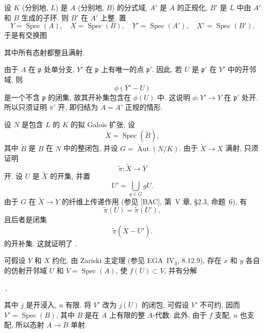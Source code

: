 \textup{}
设 \(K\) (分别地, \(L\)) 是 \(A\) (分别地, \(B\)) 的分式域,
\(A'\) 是 \(A\) 的正规化, \(B'\) 是 \(L\) 中由 \(A'\) 和 \(B\)
生成的子环. 则 \(B'\) 在 \(A'\) 上整. 置
\[
  Y=\operatorname{Spec}(A),\quad
  X=\operatorname{Spec}(B),\quad
  Y'=\operatorname{Spec}(A'),\quad
  X'=\operatorname{Spec}(B').
\]
于是有交换图
\begin{center}
  \label{diag:sga3-VIB-5.6.0-integral-square}%
\end{center}
其中所有态射都整且满射.

由于 \(A\) 在 \(\mathfrak p\) 处单分支,
\(Y'\) 在 \(\mathfrak p\) 上有唯一的点 \(\mathfrak p'\).
因此, 若 \(U\) 是 \(\mathfrak p'\) 在 \(Y'\) 中的开邻域, 则
\[
  \phi(Y'-U)
\]
是一个不含 \(\mathfrak p\) 的闭集,
故其开补集包含在 \(\phi(U)\) 中.
这说明 \(\phi:Y'\to Y\) 在 \(\mathfrak p'\) 处开.
所以只须证明 \(\pi'\) 开, 即归结为 \(A=A'\) 正规的情形.

设 \(N\) 是包含 \(L\) 的 \(K\) 的拟 Galois 扩张, 设
\[
  \widetilde X=\operatorname{Spec}(\widetilde B),
\]
其中 \(\widetilde B\) 是 \(B\) 在 \(N\) 中的整闭包,
并设 \(G=\operatorname{Aut}(N/K)\).
由于 \(\widetilde X\to X\) 满射, 只须证明
\[
  \widetilde\pi:\widetilde X\longrightarrow Y
\]
开. 设 \(U\) 是 \(\widetilde X\) 的开集, 并置
\[
  U'=\bigcup_{g\in G}gU.
\]
由于 \(G\) 在 \(\widetilde X\to Y\) 的纤维上传递作用
(参见 [BAC], 第~V 章, \S2.3, 命题~6), 有
\[
  \widetilde\pi(U)=\widetilde\pi(U'),
\]
且后者是闭集
\[
  \widetilde\pi(\widetilde X-U').
\]
的开补集. 这就证明了 \textup{}.

\textup{}
可假设 \(Y\) 和 \(X\) 约化. 由 Zariski 主定理
(参见 EGA~IV\(_3\), 8.12.9), 存在 \(x\) 和 \(y\)
各自的仿射开邻域 \(U\) 和 \(V=\operatorname{Spec}(A)\),
使 \(f(U)\subset V\), 并有分解
\begin{center}
  \label{diag:sga3-VIB-5.6.0-zariski-factorization}%
  \,,
\end{center}
其中 \(j\) 是开浸入, \(u\) 有限.
将 \(V'\) 改为 \(j(U)\) 的闭包, 可假设 \(V'\) 不可约,
因而 \(V'=\operatorname{Spec}(B)\), 其中 \(B\) 是在 \(A\) 上有限的整
\(A\)-代数. 此外, 由于 \(f\) 支配, \(u\) 也支配,
所以态射 \(A\to B\) 单射.


